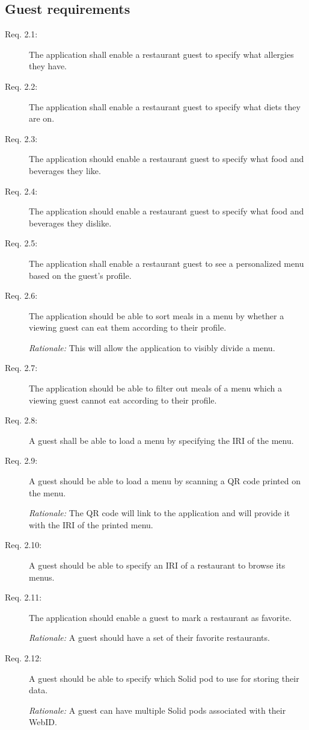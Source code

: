 \subsection{Guest requirements}
\begin{description}
    \item [Req. 2.1:] The application shall enable a restaurant guest to specify what allergies they have.
    \item [Req. 2.2:] The application shall enable a restaurant guest to specify what diets they are on.
    \item [Req. 2.3:] The application should enable a restaurant guest to specify what food and beverages they like.
    \item [Req. 2.4:] The application should enable a restaurant guest to specify what food and beverages they dislike.
    \item [Req. 2.5:] The application shall enable a restaurant guest to see a personalized menu based on the guest's profile.
    \item [Req. 2.6:] The application should be able to sort meals in a menu by whether a viewing guest can eat them according to their profile.

    \emph{Rationale:} This will allow the application to visibly divide a menu.
    \item [Req. 2.7:] The application should be able to filter out meals of a menu which a viewing guest cannot eat according to their profile.
    \item [Req. 2.8:] A guest shall be able to load a menu by specifying the IRI of the menu.
    \item [Req. 2.9:] A guest should be able to load a menu by scanning a QR code printed on the menu.

    \emph{Rationale:} The QR code will link to the application and will provide it with the IRI of the printed menu.
    \item [Req. 2.10:] A guest should be able to specify an IRI of a restaurant to browse its menus.
    \item [Req. 2.11:] The application should enable a guest to mark a restaurant as favorite.
    
    \emph{Rationale:} A guest should have a set of their favorite restaurants.
    \item [Req. 2.12:] A guest should be able to specify which Solid pod to use for storing their data.

    \emph{Rationale:} A guest can have multiple Solid pods associated with their WebID.
\end{description}

